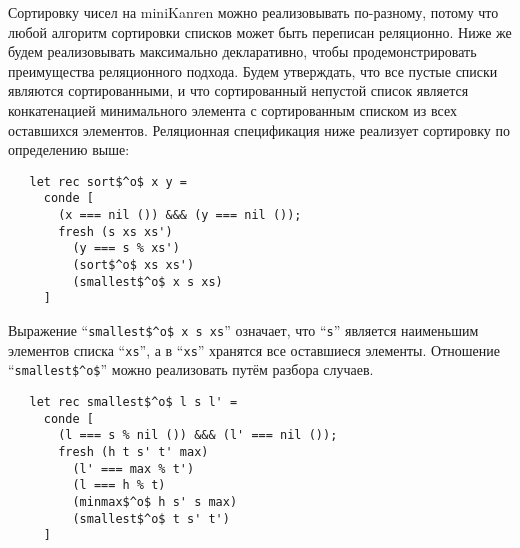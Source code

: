 Сортировку чисел на miniKanren можно реализовывать по-разному, потому что любой алгоритм сортировки списков может быть переписан реляционно.
Ниже же будем реализовывать максимально декларативно, чтобы продемонстрировать преимущества реляционного подхода.
Будем утверждать, что все пустые списки являются сортированными, и что сортированный непустой список является конкатенацией минимального элемента с сортированным списком из всех оставшихся элементов. Реляционная спецификация ниже реализует сортировку по определению выше:



\begin{lstlisting}
   let rec sort$^o$ x y =
     conde [
       (x === nil ()) &&& (y === nil ());
       fresh (s xs xs')
         (y === s % xs')
         (sort$^o$ xs xs')
         (smallest$^o$ x s xs)
     ]
\end{lstlisting}

Выражение \enquote{\lstinline|smallest$^o$ x s xs|} означает, что \enquote{\lstinline|s|} является наименьшим элементов списка \enquote{\lstinline|xs|}, а в  \enquote{\lstinline|xs|} хранятся все оставшиеся элементы.
Отношение \enquote{\lstinline|smallest$^o$|} можно реализовать путём разбора случаев.


\begin{lstlisting}
   let rec smallest$^o$ l s l' =
     conde [
       (l === s % nil ()) &&& (l' === nil ());
       fresh (h t s' t' max)
         (l' === max % t')
         (l === h % t)
         (minmax$^o$ h s' s max)
         (smallest$^o$ t s' t')
     ]
\end{lstlisting}


